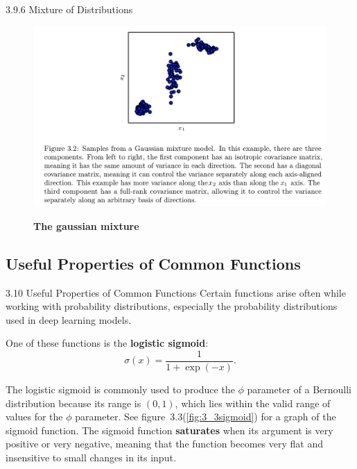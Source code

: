 \begin{frame}{3.9.6 Mixture of Distributions}
    \begin{figure}
        \centering
        \includegraphics[scale=0.20]{images/3-2-gaussian_mixture.png}
        \label{fig:3_2gaussian_mixture}
        \caption{\textbf{The gaussian mixture}}
    \end{figure}
\end{frame}

\subsection{Useful Properties of Common Functions}
\begin{frame}{3.10 Useful Properties of Common Functions}
    \justifying
    Certain functions arise often while working with probability distributions, especially the probability distributions used in deep learning models.
    
    One of these functions is the \textbf{logistic sigmoid}:
    \begin{equation}
        \sigma(x) = \frac{1}{1 + \exp(-x)}.
        \label{eq:3_30}
    \end{equation}
    
    The logistic sigmoid is commonly used to produce the $\phi$ parameter of a Bernoulli distribution because its range is $(0, 1)$, which lies within the valid range of values for the $\phi$ parameter. See figure~3.3(\ref{fig:3_3sigmoid}) for a graph of the sigmoid function. The sigmoid function \textbf{saturates} when its argument is very positive or very negative, meaning that the function becomes very flat and insensitive to small changes in its input.
\end{frame}

